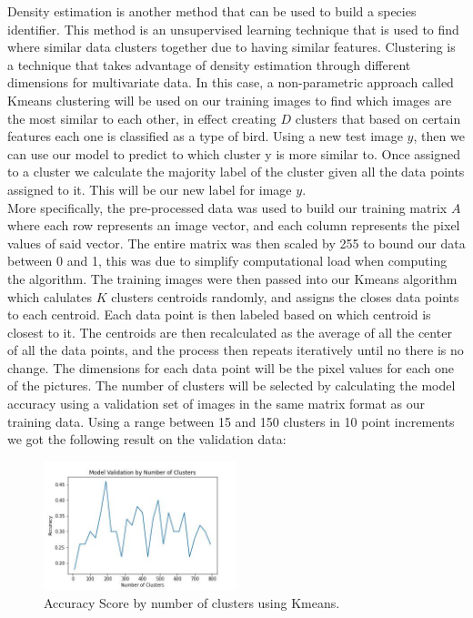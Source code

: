\documentclass[11pt]{article}
\begin{document}
\begin{singlespace}
Density estimation is another method that can be used to build a species identifier. This method is an unsupervised learning technique that is used to find where similar data clusters together due to having similar features. Clustering is a technique that takes advantage of density estimation through different dimensions for multivariate data. In this case, a non-parametric approach called Kmeans clustering will be used on our training images to find which images are the most similar to each other, in effect creating $D$ clusters that based on certain features each one is classified as a type of bird. Using a new test image $y$, then we can use our model to predict to which cluster y is more similar to. Once assigned to a cluster we calculate the majority label of the cluster given all the data points assigned to it. This will be our new label for image $y$. \\

More specifically, the pre-processed data was used to build our training matrix $A$ where each row represents an image vector, and each column represents the pixel values of said vector. The entire matrix was then scaled by 255 to bound our data between 0 and 1, this was due to simplify computational load when computing the algorithm. The training images were then passed into our Kmeans algorithm which calulates $K$ clusters centroids randomly, and assigns the closes data points to each centroid. Each data point is then labeled based on which centroid is closest to it. The centroids are then recalculated as the average of all the center of all the data points, and the process then repeats iteratively until no there is no change. The dimensions for each data point will be the pixel values for each one of the pictures. The number of clusters will be selected by calculating the model accuracy using a validation set of images in the same matrix format as our training data. Using a range between 15 and 150 clusters in 10 point increments we got the following result on the validation data: \\

\begin{figure}[h]
    \centering
    \includegraphics[width=0.5\textwidth]{plots/den-est-valid.jpg}
    \caption{Accuracy Score by number of clusters using Kmeans.}
\end{figure}


\end{singlespace}
\end{document}
